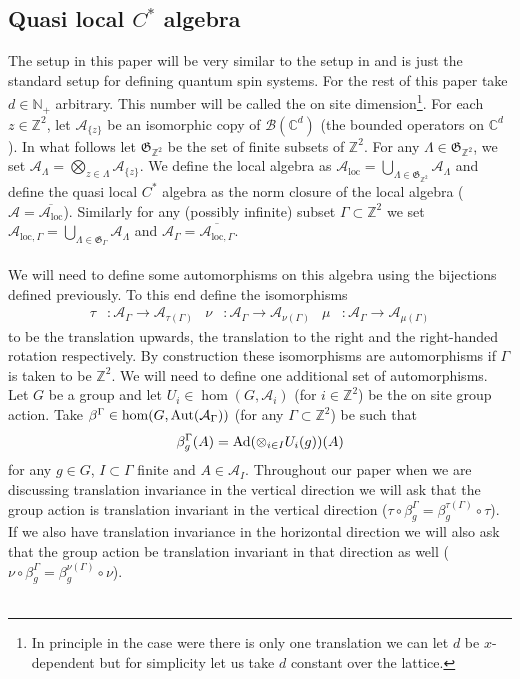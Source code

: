 \documentclass[12pt,a4paper,twoside]{article}
\let\originalleft\left
\let\originalright\right
\renewcommand{\left}{\mathopen{}\mathclose\bgroup\originalleft}
\renewcommand{\right}{\aftergroup\egroup\originalright}
\newcommand{\BB}{\mathcal B}
\newcommand{\ZZ}{\mathbb Z}
\newcommand{\CC}{\mathbb C}
\renewcommand{\AA}{\mathcal A}
\newcommand{\NN}{\mathbb{N}}
\newcommand{\Ad}[1]{\textrm{Ad}\left(#1\right)}
\newcommand{\Aut}[1]{\textrm{Aut}\left(#1\right)}
\theoremstyle{definition}
\numberwithin{equation}{section}
\begin{document}
\subsection{Quasi local $C^*$ algebra}\label{sec:QuasiLocalC*Algebra}
The setup in this paper will be very similar to the setup in \cite{ogata2021h3gmathbb} and is just the standard setup for defining quantum spin systems. For the rest of this paper take $d\in\NN_+$ arbitrary. This number will be called the on site dimension\footnote{In principle in the case were there is only one translation we can let $d$ be $x$-dependent but for simplicity let us take $d$ constant over the lattice.}. For each $z\in\ZZ^2$, let $\AA_{\{z\}}$ be an isomorphic copy of $\BB(\CC^d)$ (the bounded operators on $\CC^d$). In what follows let $\mathfrak{G}_{\ZZ^2}$ be the set of finite subsets of $\ZZ^2$. For any $\Lambda\in\mathfrak{G}_{\ZZ^2}$, we set $\AA_\Lambda=\bigotimes_{z\in\Lambda}\AA_{\{z\}}$. We define the local algebra as $\AA_{\text{loc}}=\bigcup_{\Lambda\in \mathfrak{G}_{\ZZ^2}}\AA_{\Lambda}$ and define the quasi local $C^*$ algebra as the norm closure of the local algebra ($\AA=\overline{\AA_{\text{loc}}}$). Similarly for any (possibly infinite) subset $\Gamma\subset\ZZ^2$ we set $\AA_{\text{loc},\Gamma}=\bigcup_{\Lambda\in \mathfrak{G}_{\Gamma}}\AA_{\Lambda}$ and $\AA_\Gamma=\overline{\AA_{\text{loc},\Gamma}}$.\\\\
We will need to define some automorphisms on this algebra using the bijections defined previously. To this end define the isomorphisms
\begin{align}
	\tau&:\AA_\Gamma\rightarrow\AA_{\tau(\Gamma)}&\nu&:\AA_\Gamma\rightarrow\AA_{\nu(\Gamma)}&\mu&:\AA_\Gamma\rightarrow\AA_{\mu(\Gamma)}
\end{align}
to be the translation upwards, the translation to the right and the right-handed rotation respectively. By construction these isomorphisms are automorphisms if $\Gamma$ is taken to be $\ZZ^2$. We will need to define one additional set of automorphisms. Let $G$ be a group and let $U_i\in\hom(G,\AA_i)$ (for $i\in\ZZ^2$) be the on site group action. Take $\beta^\Gamma\in\hom(G,\Aut{\AA_\Gamma})$ (for any $\Gamma\subset\ZZ^2$) be such that
\begin{equation}
	\beta^\Gamma_g(A)=\Ad{\otimes_{i\in I} U_i(g)}(A)
\end{equation}
for any $g\in G$, $I\subset\Gamma$ finite and $A\in\AA_I$. Throughout our paper when we are discussing translation invariance in the vertical direction we will ask that the group action is translation invariant in the vertical direction ($\tau\circ\beta_g^\Gamma=\beta_g^{\tau(\Gamma)}\circ\tau$). If we also have translation invariance in the horizontal direction we will also ask that the group action be translation invariant in that direction as well ($\nu\circ\beta_g^\Gamma=\beta_g^{\nu(\Gamma)}\circ\nu$).\\\\
\end{document}
